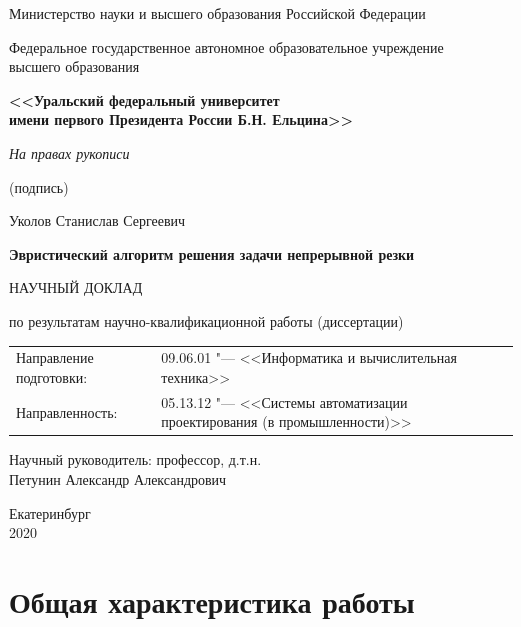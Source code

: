 \documentclass[14pt]{extarticle}
\theoremstyle{plain}%
\theoremstyle{remark}
\begin{document}
\thispagestyle{empty}
\begin{center}
{\small
Министерство науки и высшего образования Российской Федерации

Федеральное государственное автономное образовательное учреждение \\
высшего образования

\textbf{<<Уральский федеральный университет\\
имени первого Президента России Б.Н. Ельцина>>}
}

\vspace{0pt plus2fill}
\begin{flushright}
\begin{minipage}{0.5\linewidth}
  \centering
  \textit{На правах рукописи}

  \small {(подпись)}
\end{minipage}
\end{flushright}


\vspace{0pt plus4fill}
Уколов Станислав Сергеевич

\vspace{0pt plus1fill}
\textbf{
Эвристический алгоритм решения задачи непрерывной резки
}

\vspace{0pt plus1fill}
НАУЧНЫЙ ДОКЛАД

по результатам научно-квалификационной работы (диссертации)

\vspace{0pt plus2fill}
\begin{tabular}{l p{10cm}}
  Направление подготовки: &
  09.06.01
  "---
  <<Информатика и вычислительная техника>>
  \\
  Направленность: &
  05.13.12
  "---
  <<Системы автоматизации проектирования (в промышленности)>>
\end{tabular}

\vspace{0pt plus4fill}
\begin{flushright}
Научный руководитель:
профессор,
д.т.н.
\\
Петунин Александр Александрович
\end{flushright}

\vspace{0pt plus6fill}
Екатеринбург
\\
2020
\end{center}
\newpage

\tableofcontents
\newpage

\section{Общая характеристика работы}
\end{document}
